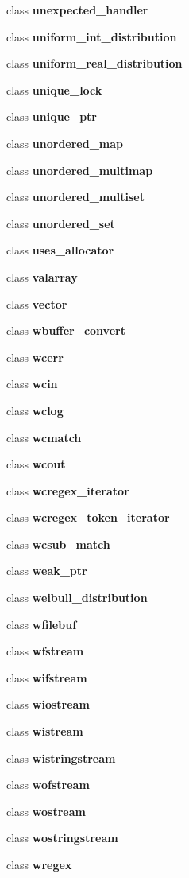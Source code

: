 \begin{DoxyCompactItemize}
\item 
class \textbf{ unexpected\+\_\+handler}
\item 
class \textbf{ uniform\+\_\+int\+\_\+distribution}
\item 
class \textbf{ uniform\+\_\+real\+\_\+distribution}
\item 
class \textbf{ unique\+\_\+lock}
\item 
class \textbf{ unique\+\_\+ptr}
\item 
class \textbf{ unordered\+\_\+map}
\item 
class \textbf{ unordered\+\_\+multimap}
\item 
class \textbf{ unordered\+\_\+multiset}
\item 
class \textbf{ unordered\+\_\+set}
\item 
class \textbf{ uses\+\_\+allocator}
\item 
class \textbf{ valarray}
\item 
class \textbf{ vector}
\item 
class \textbf{ wbuffer\+\_\+convert}
\item 
class \textbf{ wcerr}
\item 
class \textbf{ wcin}
\item 
class \textbf{ wclog}
\item 
class \textbf{ wcmatch}
\item 
class \textbf{ wcout}
\item 
class \textbf{ wcregex\+\_\+iterator}
\item 
class \textbf{ wcregex\+\_\+token\+\_\+iterator}
\item 
class \textbf{ wcsub\+\_\+match}
\item 
class \textbf{ weak\+\_\+ptr}
\item 
class \textbf{ weibull\+\_\+distribution}
\item 
class \textbf{ wfilebuf}
\item 
class \textbf{ wfstream}
\item 
class \textbf{ wifstream}
\item 
class \textbf{ wiostream}
\item 
class \textbf{ wistream}
\item 
class \textbf{ wistringstream}
\item 
class \textbf{ wofstream}
\item 
class \textbf{ wostream}
\item 
class \textbf{ wostringstream}
\item 
class \textbf{ wregex}
\item 

\end{DoxyCompactItemize}
